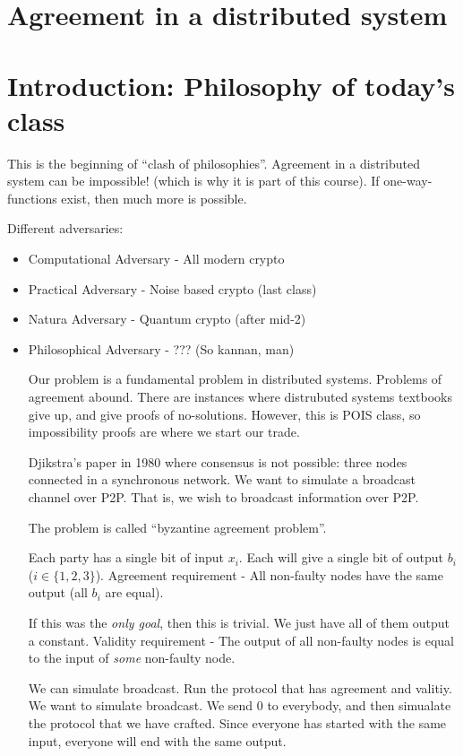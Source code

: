 \section{Agreement in a distributed system}

\section{Introduction: Philosophy of today's class}
This is the beginning of ``clash of philosophies''.
Agreement in a distributed system can be impossible! (which is why it is part of this course).
If one-way-functions exist, then much more is possible.

Different adversaries:
\begin{itemize}
\item Computational Adversary - All modern crypto
\item Practical Adversary - Noise based crypto (last class)
\item Natura Adversary - Quantum crypto (after mid-2)
\item Philosophical Adversary - ??? (So kannan, man)

  Our problem is a fundamental problem in distributed systems. Problems of agreement abound.
  There are instances where distrubuted systems textbooks give up, and give proofs of no-solutions.
  However, this is POIS class, so impossibility proofs are where we start our trade.

  
  Djikstra's paper in 1980 where consensus is not possible: three nodes connected in a synchronous network.
  We want to simulate a broadcast channel over P2P. That is, we wish to broadcast information over P2P.

  The problem is called ``byzantine agreement problem''.

  Each party has a single bit of input $x_i$. Each will give a single bit of output $b_i$ ($i \in \{ 1, 2, 3 \}$).
  Agreement  requirement - All non-faulty nodes have the same output (all $b_i$ are equal).

  If this was the \textit{only goal}, then this is trivial. We just have all of them output a constant.
  Validity requirement - The output of all non-faulty nodes is equal to the input of \textit{some} non-faulty node.


  We can simulate broadcast. Run the protocol that has agreement and valitiy. We want to simulate broadcast. We send $0$ to everybody,
  and then simualate the protocol that we have crafted. Since everyone has started with the same input, everyone will end with the
  same output.


\end{itemize}
